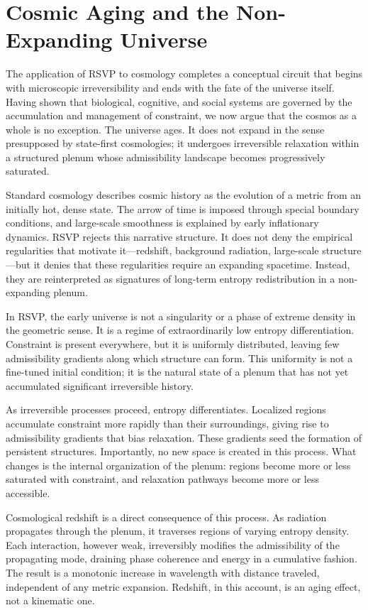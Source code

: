 \documentclass[11pt,oneside]{book}
\begin{document}
\chapter{Cosmic Aging and the Non-Expanding Universe}

The application of RSVP to cosmology completes a conceptual circuit that begins with microscopic irreversibility and ends with the fate of the universe itself. Having shown that biological, cognitive, and social systems are governed by the accumulation and management of constraint, we now argue that the cosmos as a whole is no exception. The universe ages. It does not expand in the sense presupposed by state-first cosmologies; it undergoes irreversible relaxation within a structured plenum whose admissibility landscape becomes progressively saturated.

Standard cosmology describes cosmic history as the evolution of a metric from an initially hot, dense state. The arrow of time is imposed through special boundary conditions, and large-scale smoothness is explained by early inflationary dynamics. RSVP rejects this narrative structure. It does not deny the empirical regularities that motivate it—redshift, background radiation, large-scale structure—but it denies that these regularities require an expanding spacetime. Instead, they are reinterpreted as signatures of long-term entropy redistribution in a non-expanding plenum.

In RSVP, the early universe is not a singularity or a phase of extreme density in the geometric sense. It is a regime of extraordinarily low entropy differentiation. Constraint is present everywhere, but it is uniformly distributed, leaving few admissibility gradients along which structure can form. This uniformity is not a fine-tuned initial condition; it is the natural state of a plenum that has not yet accumulated significant irreversible history.

As irreversible processes proceed, entropy differentiates. Localized regions accumulate constraint more rapidly than their surroundings, giving rise to admissibility gradients that bias relaxation. These gradients seed the formation of persistent structures. Importantly, no new space is created in this process. What changes is the internal organization of the plenum: regions become more or less saturated with constraint, and relaxation pathways become more or less accessible.

Cosmological redshift is a direct consequence of this process. As radiation propagates through the plenum, it traverses regions of varying entropy density. Each interaction, however weak, irreversibly modifies the admissibility of the propagating mode, draining phase coherence and energy in a cumulative fashion. The result is a monotonic increase in wavelength with distance traveled, independent of any metric expansion. Redshift, in this account, is an aging effect, not a kinematic one.
\end{document}
